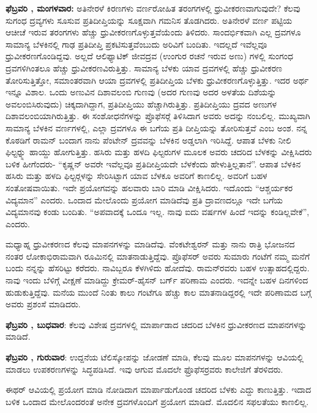 \textbf{ಫೆಬ್ರವರಿ , ಮಂಗಳವಾರ:} ಅತಿನೇರಳೆ ಕಿರಣಗಳು ವರ್ಣರೋಹಿತ ತರಂಗಗಳಲ್ಲಿ ಧ್ರುವೀಕರಣವಾಗುವುದೇ? ಕೆಲವು ಸುಗಂಧ ದ್ರವ್ಯಗಳು ಸೂಸುವ ಪ್ರತಿದೀಪ್ತಿಯನ್ನು ಸೂಕ್ಷವಾಗಿ ಗಮನಿಸ ತೊಡಗಿದರು. ಅತಿನೇರಳೆ ವರ್ಣ ಪಟ್ಟಿಯ ಆಚೀಚೆ ಇರುವ ತರಂಗಗಳು ಹೆಚ್ಚು ಧ್ರುವೀಕರಣಗೊಳ್ಳುತ್ತವೆಯೆಂದು ತಿಳಿದರು. ಸಾಂದರ್ಭಿಕವಾಗಿ ಎಲ್ಲ ದ್ರವಗಳೂ ಸಾಮಾನ್ಯ ಬೆಳಕಿನಲ್ಲಿ ಗಾಢ ಪ್ರತಿದೀಪ್ತಿ ಪ್ರಕಟಿಸುತ್ತವೆಂಬುದು ಅರಿವಿಗೆ ಬಂದಿತು. ಇದಲ್ಲದೆ ಇವೆಲ್ಲವೂ ಧ್ರುವೀಕರಣಗೊಂಡಿದ್ದವು. ಅಲ್ಲದೆ ಆಲಿಫ್ಯಾಟಿಕ್ ಜೀವದ್ರವ (ಉಂಗುರ ರಚನೆ ಇರುವ ಅಣು) ಗಳಲ್ಲಿ ಸುಂಗಂಧ ದ್ರವಗಳಿಗಿಂತಲೂ ಹೆಚ್ಚು ಧ್ರುವೀಕರಣವಿರುತ್ತಿತ್ತು. ಸಾಮಾನ್ಯ ಬೆಳಕು ಯಾವ ದ್ರವಗಳಲ್ಲಿ ಹೆಚ್ಚು ಧ್ರುವೀಕರಣ ತೋರಿಸುತ್ತಿತ್ತೋ, ಸಮಾಂತರವಾಗಿ ಆಯಾ ದ್ರವಗಳಲ್ಲಿ ಪ್ರತಿದೀಪ್ತಿಯ ಬೆಳಕು ಧ್ರುವೀಕರಣಗೊಳ್ಳುತ್ತಿತ್ತು. ಇದರ ಅರ್ಥ ಇನ್ನೂ ವಿಶಾಲ. ಒಂದು ಅಣುವಿನ ದಿಶಾವಲಂಬಿ ಗುಣವು (ಅದರ ಗುಣವು ಅದರ ಅಳತೆಯ ದಿಶೆಯನ್ನು ಅವಲಂಬಿಸಿರುವುದು) ಚಿಕ್ಕದಾಗಿದ್ದಾಗ, ಪ್ರತಿದೀಪ್ತಿಯು ಹೆಚ್ಚಾಗಿರುತ್ತಿತ್ತು. ಪ್ರತಿದೀಪ್ತಿಯು ದ್ರವದ ಅಣುಗಳ ದಿಶಾವಲಂಬಿಯಾಗಿರುತ್ತಿತ್ತು. ಈ ಸಂಶೋಧನೆಗಳನ್ನು ಪ್ರೊಫೆಸರ್‍ಗೆ ತಿಳಿಸಿದಾಗ ಅವರು ಅದನ್ನು ನಂಬಲಿಲ್ಲ. ಮುಖ್ಯವಾಗಿ ಸಾಮಾನ್ಯ ಬೆಳಕಿನ ವರ್ಣಗಳಲ್ಲಿ, ಎಲ್ಲಾ ದ್ರವಗಳೂ ಈ ಬಗೆಯ ಪ್ರತಿ ದೀಪ್ತಿಯನ್ನು ತೋರಿಸುತ್ತವೆ ಎಂಬ ಅಂಶ. ನನ್ನ ಕೊಠಡಿಗೆ ರಾಮನ್ ಬಂದಾಗ ನಾನು ಪೆಂಟೇನ್ ದ್ರವವನ್ನು ಬೆಳಕಿನ ಅಡ್ಡಲಾಗಿ ಇರಿಸಿದ್ದೆ. ಆಪಾತ ಬೆಳಕು ನೀಲಿ ಫಿಲ್ಟರ್‍ನ್ನು ಹಾಯ್ದು ಹೋಗುತ್ತಿತ್ತು. ಹಸಿರು ಮತ್ತು ಹಳದಿ ಫಿಲ್ಟರುಗಳ ಮೂಲಕ ಅವರು ಚದರಿದ ಬೆಳಕನ್ನು ವೀಕ್ಷಿಸಿದರು ಬಳಿಕ ಹೀಗೆಂದರು- “ಕೃಷ್ಣನ್ ಅವರೇ ಇವೆಲ್ಲವೂ ಪ್ರತಿದೀಪ್ತಿಯದೇ ಬೆಳಕೆಂದು ಹೇಳುತ್ತಿಲ್ಲತಾನೆ”. ಆಪಾತ ಬೆಳಕಿನ ಹಸಿರು ಮತ್ತು ಹಳದಿ ಫಿಲ್ಟರ್‍ಗಳನ್ನು ಸೇರಿಸಿಟ್ಟಾಗ ಯಾವ ಬೆಳಕೂ ಅವರಿಗೆ ಕಾಣಲಿಲ್ಲ. ಅವರಿಗೆ ಬಹಳ ಸಂತೋಷವಾಯಿತು. ಇದೇ ಪ್ರಯೋಗವನ್ನು ಹಲವಾರು ಬಾರಿ ಮಾಡಿ ವೀಕ್ಷಿಸಿದರು. ಇದೊಂದು “ಆಶ್ಚರ್ಯಕರ ವಿದ್ಯಮಾನ” ಎಂದರು. ಒಂದಾದ ಮೇಲೊಂದು ಪ್ರಯೋಗ ಮಾಡಿದೆವು ಪ್ರತಿ ದ್ರಾವಣದಲ್ಲೂ ಇದೇ ಬಗೆಯ ವಿದ್ಯಮಾನವು ಕಂಡು ಬಂದಿತು. “ಅಪವಾದಕ್ಕೆ ಒಂದೂ ಇಲ್ಲ. ನಾವು ಐದು ವರ್ಷಗಳ ಹಿಂದೆ ಇದನ್ನು ಕಂಡಿಲ್ಲವೇಕೆ”, ಎಂದರು.

ಮಧ್ಯಾಹ್ನ ಧ್ರುವೀಕರಣದ ಕೆಲವು ಮಾಪನಗಳನ್ನು ಮಾಡಿದೆವು. ವೆಂಕಟೇಶ್ವರನ್ ಮತ್ತು ನಾನು ರಾತ್ರಿ ಭೋಜನದ ನಂತರ ಲೋಕಾಭಿರಾಮವಾಗಿ ರೂಮಿನಲ್ಲಿ ಮಾತನಾಡುತ್ತಿದ್ದೆವು. ಪ್ರೊಫೆಸರ್ ಅವರು ಸುಮಾರು  ಗಂಟೆಗೆ ನಮ್ಮ ಮನೆಗೆ ಬಂದು ನನ್ನನ್ನು ಹೆಸರಿಟ್ಟು ಕರೆದರು. ನಾವಿಬ್ಬರೂ ಕೆಳಗಿಳಿದು ಹೋದೆವು. ರಾಮನ್‍ರವರು ಬಹಳ ಉತ್ಸಾಹದಲ್ಲಿದ್ದರು. ನಾವು ಇಂದು ಬೆಳಿಗ್ಗೆ ವೀಕ್ಷಣೆ ಮಾಡಿದ್ದು ಕ್ರೇಮರ್-ಹೈಸನ್ ಬರ್ಗ್ ಪರಿಣಾಮ ಎಂದರು. ಇದನ್ನೇ ಬಹಳ ದಿನಗಳಿಂದ ಹುಡುಕುತ್ತಿದ್ದೆವು. ಮನೆಯ ಮುಂದೆ ನಿಂತು ಕಾಲು ಗಂಟೆಗೂ ಹೆಚ್ಚು ಕಾಲ ಮಾತನಾಡಿದ್ದರಲ್ಲಿ ಇದೇ ಪರಿಣಾಮದ ಬಗ್ಗೆ ಅವರು ಪ್ರಶಂಸೆ ಮಾಡಿದರು.

\textbf{ಫೆಬ್ರವರಿ , ಬುಧವಾರ}: ಕೆಲವು ವಿಶೇಷ ದ್ರವಗಳಲ್ಲಿ ಮಾರ್ಪಾಡಾದ ಚದರಿದ ಬೆಳಕಿನ ಧ್ರುವೀಕರಣದ ಮಾಪನಗಳನ್ನು ಮಾಡಿದೆ.

\textbf{ಫೆಬ್ರವರಿ , ಗುರುವಾರ}: ಉದ್ದನೆಯ ಟೆಲಿಸ್ಕೋಪನ್ನು ಜೋಡಣೆ ಮಾಡಿ, ಕೆಲವು ಮೂಲ ಮಾಪನಗಳನ್ನು ಆವಿಯಲ್ಲಿ ಮಾಡಲು ಉಪಕರಣಗಳನ್ನು ಸಿದ್ಧಪಡಿಸಿದೆ. ಇವು ಆಗುವ ಮೊದಲೇ ಫ್ರೊಫೆಸರ್‍ರವರು ಕಾಲೇಜಿಗೆ ತೆರಳಿದರು.

ಈಥರ್ ಆವಿಯಲ್ಲಿ ಪ್ರಯೋಗ ಮಾಡಿ ನೋಡಿದಾಗ ಮಾರ್ಪಾಡುಗೊಂಡ ಚದರಿದ ಬೆಳಕು ಎದ್ದು ಕಾಣುತ್ತಿತ್ತು. ಇದಾದ ಬಳಿಕ ಒಂದಾದ ಮೇಲೊಂದರಂತೆ ಅನೇಕ ದ್ರವಗಳೊಂದಿಗೆ ಪ್ರಯೋಗ ಮಾಡಿದೆ. ಮೊದಲಿನ ಸಫಲತೆಯು ಕಾಣಲಿಲ್ಲ.

